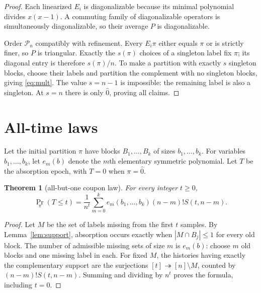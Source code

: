 \documentclass[a4paper,10pt]{amsart}
\newtheorem{theorem}{Theorem}[section]
\theoremstyle{remark}
\newcommand{\Pn}{\mathcal P_n}
\begin{document}
\begin{proof}
Each linearized $E_i$ is diagonalizable because its minimal polynomial
divides $x(x-1)$.  A commuting family of diagonalizable operators is
simultaneously diagonalizable, so their average $P$ is diagonalizable.

Order $\Pn$ compatibly with refinement.  Every $E_i\pi$ either equals
$\pi$ or is strictly finer, so $P$ is triangular.  Exactly the $s(\pi)$
choices of a singleton label fix $\pi$; its diagonal entry is therefore
$s(\pi)/n$.  To make a partition with exactly $s$ singleton blocks, choose
their labels and partition the complement with no singleton blocks, giving
\eqref{eq:mult}.  The value $s=n-1$ is impossible: the remaining label is
also a singleton.  At $s=n$ there is only $\widehat0$, proving all claims.
\end{proof}

\section{All-time laws}

Let the initial partition $\pi$ have blocks $B_1,\ldots,B_k$ of sizes
$b_1,\ldots,b_k$.  For variables $b_1,\ldots,b_k$, let $e_m(b)$ denote the
$m$th elementary symmetric polynomial.  Let $T$ be the absorption epoch,
with $T=0$ when $\pi=\widehat0$.

\begin{theorem}[all-but-one coupon law]\label{thm:absorb}
For every integer $t\ge0$,
\begin{equation}\label{eq:absorb}
 \Pr_\pi(T\le t)=\frac1{n^t}\sum_{m=0}^{k}
 e_m(b_1,\ldots,b_k)(n-m)!S(t,n-m).
\end{equation}
\end{theorem}

\begin{proof}
Let $M$ be the set of labels missing from the first $t$ samples.  By
Lemma~\ref{lem:support}, absorption occurs exactly when
$|M\cap B_j|\le1$ for every old block.  The number of admissible missing sets
of size $m$ is $e_m(b)$: choose $m$ old blocks and one missing label in each.
For fixed $M$, the histories having exactly the complementary support are
the surjections $[t]\twoheadrightarrow[n]\setminus M$, counted by
$(n-m)!S(t,n-m)$.  Summing and dividing by $n^t$ proves the formula, including
$t=0$.
\end{proof}
\end{document}
